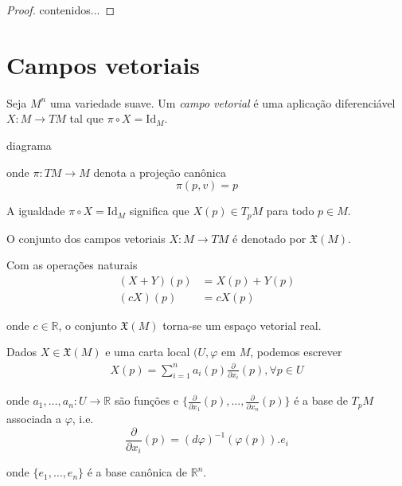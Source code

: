 \begin{proof}
	contenidos...
\end{proof}

\section{Campos vetoriais}

\begin{defi}
	Seja $M^n$ uma variedade suave. Um \emph{campo vetorial} é uma aplicação diferenciável $X: M \rightarrow TM$ tal que $\pi \circ X = \text{Id}_M$.
	
	diagrama
	
	onde $\pi: TM \rightarrow M$ denota a projeção canônica
	\begin{equation*}
		\pi(p,v) = p
	\end{equation*}
\end{defi}

\begin{obse}
	A igualdade $\pi \circ X = \text{Id}_M$ significa que $X(p) \in T_p M$ para todo $p \in M$.
\end{obse}

\begin{nota}
	O conjunto dos campos vetoriais $X: M \rightarrow TM$ é denotado por $\mathfrak{X}(M)$.
\end{nota}

\begin{obse}
	Com as operações naturais
	\begin{align*}
		(X+Y)(p) &= X(p) + Y(p)\\
		(cX)(p) &= c X(p)
	\end{align*}
	
	onde $c \in \mathbb{R}$, o conjunto $\mathfrak{X}(M)$ torna-se um espaço vetorial real.
\end{obse}

\begin{obse}
	Dados $X \in \mathfrak{X}(M)$ e uma carta local $(U, \varphi$ em $M$, podemos escrever
	\begin{align*}
		X(p) = \sum_{i=1}^n a_i (p) \frac{\partial}{\partial x_i} (p), \forall p \in U
	\end{align*}
	
	onde $a_1, \ldots, a_n: U \rightarrow \mathbb{R}$ são funções e $\{ \frac{\partial}{\partial x_1}(p), \ldots, \frac{\partial}{\partial x_n}(p) \}$ é a base de $T_p M$ associada a $\varphi$, i.e.
	\begin{equation*}
		\frac{\partial}{\partial x_i} (p) = (d \varphi)^{-1}(\varphi(p)).e_i
	\end{equation*}
	
	onde $\{ e_1, \ldots, e_n \}$ é a base canônica de $\mathbb{R}^n$.
\end{obse}

